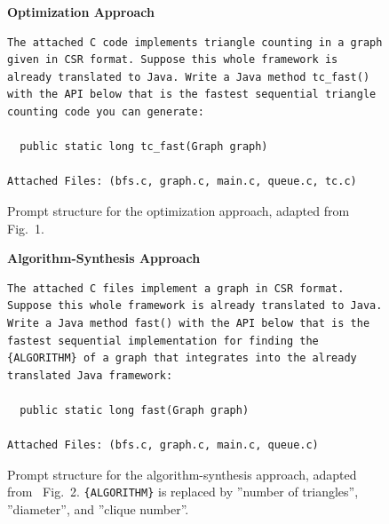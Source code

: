 \begin{figure}[H]
\noindent \textbf{Optimization Approach}
\begin{lstlisting}
The attached C code implements triangle counting in a graph given in CSR format. Suppose this whole framework is already translated to Java. Write a Java method tc_fast() with the API below that is the fastest sequential triangle counting code you can generate:

  public static long tc_fast(Graph graph)

Attached Files: (bfs.c, graph.c, main.c, queue.c, tc.c)
\end{lstlisting}
\vspace{-0.5em}
\caption{Prompt structure for the optimization approach, adapted from~\cite{llmgen2025} Fig.~1.}
\label{fig:prompt-1}
\end{figure}

\begin{figure}[H]
\noindent \textbf{Algorithm-Synthesis Approach}
\begin{lstlisting}
The attached C files implement a graph in CSR format. Suppose this whole framework is already translated to Java. Write a Java method fast() with the API below that is the fastest sequential implementation for finding the {ALGORITHM} of a graph that integrates into the already translated Java framework:

  public static long fast(Graph graph)

Attached Files: (bfs.c, graph.c, main.c, queue.c)
\end{lstlisting}
\vspace{-0.5em}
\caption{Prompt structure for the algorithm-synthesis approach, adapted from~\cite{llmgen2025} Fig.~2. \texttt{\{ALGORITHM\}} is replaced by ''number of triangles'', ''diameter'', and ''clique number''.}
\label{fig:prompt-2}
\end{figure}

\FloatBarrier



